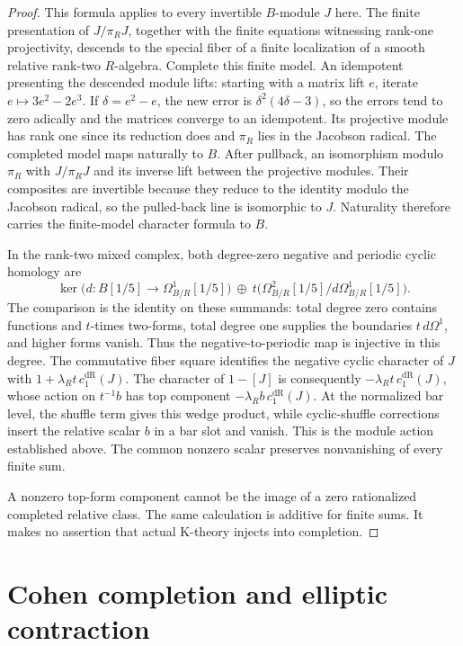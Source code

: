 \documentclass[11pt,a4paper]{amsart}
\numberwithin{equation}{section}
\theoremstyle{definition}
\theoremstyle{remark}
\newcommand{\DtwodR}{\mathrm{dR}}
\begin{document}
\begin{proof}
This formula applies to every invertible \(B\)-module \(J\) here.
The finite presentation of \(J/\pi_RJ\), together with the finite
equations witnessing rank-one projectivity, descends to the
special fiber of a finite localization of a smooth relative
rank-two \(R\)-algebra. Complete this finite model.
An idempotent presenting the descended module lifts: starting
with a matrix lift \(e\), iterate \(e\mapsto3e^2-2e^3\).
If \(\delta=e^2-e\), the new error is
\(\delta^2(4\delta-3)\), so the errors tend to zero adically
and the matrices converge to an idempotent.
Its projective module has rank one since its reduction does
and \(\pi_R\) lies in the Jacobson radical.
The completed model maps naturally to \(B\).
After pullback, an isomorphism modulo \(\pi_R\) with \(J/\pi_RJ\)
and its inverse lift between the projective modules.
Their composites are invertible because they reduce to the
identity modulo the Jacobson radical, so the pulled-back line
is isomorphic to \(J\).
Naturality therefore carries the finite-model character formula
to \(B\).

In the rank-two mixed complex, both degree-zero negative and
periodic cyclic homology are
\[
 \ker\bigl(d\colon B[1/5]\longrightarrow
                    \Omega^1_{B/R}[1/5]\bigr)
 \ \oplus\
 t\bigl(\Omega^2_{B/R}[1/5]/d\Omega^1_{B/R}[1/5]\bigr).
\]
The comparison is the identity on these summands: total degree
zero contains functions and \(t\)-times two-forms, total degree
one supplies the boundaries \(t\,d\Omega^1\), and higher forms
vanish. Thus the negative-to-periodic map is injective in this
degree. The commutative fiber square identifies the negative
cyclic character of \(J\) with
\(1+\lambda_Rt\,c_1^\DtwodR(J)\).
The character of \(1-[J]\) is consequently
\(-\lambda_Rt\,c_1^\DtwodR(J)\), whose action on \(t^{-1}b\)
has top component \(-\lambda_Rb\,c_1^\DtwodR(J)\).
At the normalized bar level, the shuffle term gives this wedge
product, while cyclic-shuffle corrections insert the relative
scalar \(b\) in a bar slot and vanish.
This is the module action established above.
The common nonzero scalar preserves nonvanishing of every
finite sum.

A nonzero top-form component cannot be the image of a zero
rationalized completed relative class.
The same calculation is additive for finite sums.
It makes no assertion that actual K-theory injects into completion.
\end{proof}

\section{Cohen completion and elliptic contraction}\label{d2:sec:cohen}
\end{document}
